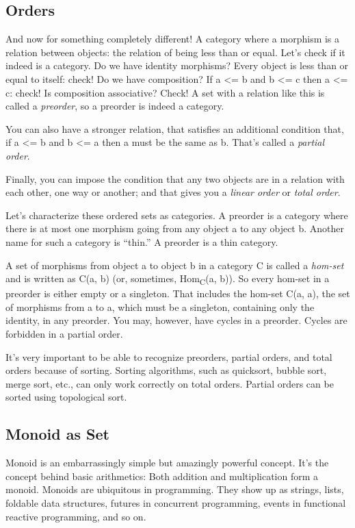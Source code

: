 \subsection{Orders}\label{orders}

And now for something completely different! A category where a morphism
is a relation between objects: the relation of being less than or equal.
Let's check if it indeed is a category. Do we have identity morphisms?
Every object is less than or equal to itself: check! Do we have
composition? If a \textless{}= b and b \textless{}= c then a
\textless{}= c: check! Is composition associative? Check! A set with a
relation like this is called a \emph{preorder}, so a preorder is indeed
a category.

You can also have a stronger relation, that satisfies an additional
condition that, if a \textless{}= b and b \textless{}= a then a must be
the same as b. That's called a \emph{partial order}.

Finally, you can impose the condition that any two objects are in a
relation with each other, one way or another; and that gives you a
\emph{linear order} or \emph{total order}.

Let's characterize these ordered sets as categories. A preorder is a
category where there is at most one morphism going from any object a to
any object b. Another name for such a category is ``thin.'' A preorder
is a thin category.

A set of morphisms from object a to object b in a category C is called a
\emph{hom-set} and is written as C(a, b) (or, sometimes,
Hom\textsubscript{C}(a, b)). So every hom-set in a preorder is either
empty or a singleton. That includes the hom-set C(a, a), the set of
morphisms from a to a, which must be a singleton, containing only the
identity, in any preorder. You may, however, have cycles in a preorder.
Cycles are forbidden in a partial order.

It's very important to be able to recognize preorders, partial orders,
and total orders because of sorting. Sorting algorithms, such as
quicksort, bubble sort, merge sort, etc., can only work correctly on
total orders. Partial orders can be sorted using topological sort.

\subsection{Monoid as Set}\label{monoid-as-set}

Monoid is an embarrassingly simple but amazingly powerful concept. It's
the concept behind basic arithmetics: Both addition and multiplication
form a monoid. Monoids are ubiquitous in programming. They show up as
strings, lists, foldable data structures, futures in concurrent
programming, events in functional reactive programming, and so on.

